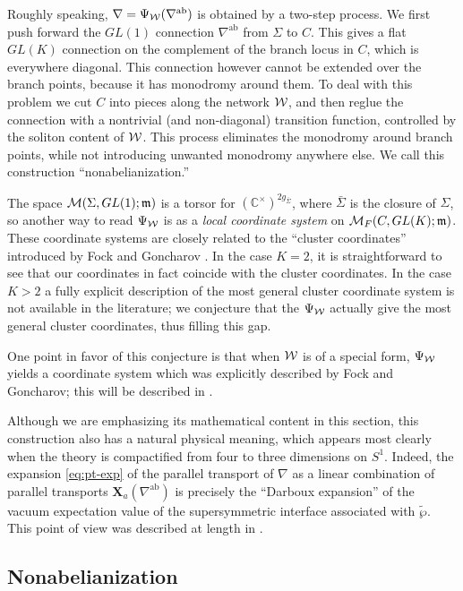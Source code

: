 \documentclass[11pt,a4paper]{article}
\def\IC{\mathbb{C}}
\def\CM {{\cal M}}
\def\wnet {{\cal W}}
\def\ab{{\mathrm{ab}}}
\def\bX{\mathbf{X}}
\newcommand{\ti}[1]{\textit{#1}}
\def\fm{\mathfrak{m}}
\def\IC{\mathbb{C}}
\def\CM {{\cal M}}
\def\wnet {{\cal W}}
\begin{document}
Roughly speaking,
$\nabla = \Psi_\wnet(\nabla^\ab)$ is obtained by a two-step process.  We first push forward the $GL(1)$ connection $\nabla^\ab$ from
$\Sigma$ to $C$.  This gives a flat $GL(K)$ connection on the complement of the branch locus in $C$, which is
everywhere diagonal.  This connection however cannot be extended over the branch points, because it has
monodromy around them.  To deal with this problem we cut $C$ into pieces along the network $\wnet$,
and then reglue the connection with a nontrivial (and non-diagonal) transition function, controlled by
the soliton content of $\wnet$.
This process eliminates the monodromy around branch points, while not introducing unwanted
monodromy anywhere else.  We call this construction ``nonabelianization.''

The space $\CM(\Sigma, GL(1); \fm)$ is a torsor for $(\IC^\times)^{2 g_{\bar\Sigma}}$,
where $\bar\Sigma$ is the closure of $\Sigma$,  so another way to
read $\Psi_\wnet$ is as a \ti{local coordinate system} on $\CM_F(C, GL(K); \fm)$.
These coordinate systems are closely related to the ``cluster coordinates''
introduced by Fock and Goncharov \cite{MR2233852}.  In the case $K=2$, it is straightforward to see that
our coordinates in fact coincide with the cluster coordinates.  In the case $K>2$ a fully explicit description
of the most general cluster coordinate system is not available in the literature; we conjecture that
the $\Psi_\wnet$ actually give the most general cluster coordinates, thus filling this gap.

One point in favor of this conjecture is that when
$\wnet$ is of a special form, $\Psi_\wnet$ yields a coordinate system which was explicitly described by
Fock and Goncharov; this will be described in \cite{gmn6-to-appear}.

Although we are emphasizing its mathematical content in this section, this
construction also has a natural physical meaning, which appears most clearly
when the theory is compactified from four to three dimensions on $S^1$.
Indeed, the expansion \eqref{eq:pt-exp} of the parallel transport of $\nabla$
as a linear combination of parallel transports $\bX_a(\nabla^\ab)$ is precisely the
``Darboux expansion'' of the vacuum expectation value of the supersymmetric interface
associated with $\tilde \wp$.  This point of view was described at length in \cite{Gaiotto:2011tf}.


\subsection{Nonabelianization}\label{subsec:PushAbelian}
\end{document}
